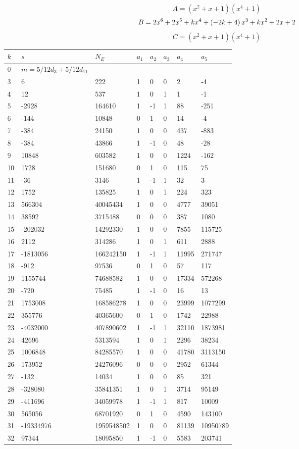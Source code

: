 \documentclass{amsart}
\begin{document}
$$A=(x^2
 + x
 + 1)(x^4
 + 1)$$
$$B=2\*x^6
 + 2\*x^5
 + k\*x^4
 + \left(-2\*k
 + 4\right) \*x^3
 + k\*x^2
 + 2\*x
 + 2$$
$$C=(x^2
 + x
 + 1)(x^4
 + 1)$$
\begin{longtable}{|l|l|l|lllll|}
\hline
$k$ & $s$ & $N_E$ & $a_1$ & $a_2$ & $a_3$ & $a_4$ & $a_5$\\
\hline
0&$m=5/12d_{3}+5/12d_{11}$&&\multicolumn{5}{c|}{}\\
3&6&222&1&0&0&2&-4\\
4&12&537&1&0&1&1&-1\\
5&-2928&164610&1&-1&1&88&-251\\
6&-144&10848&0&1&0&14&-4\\
7&-384&24150&1&0&0&437&-883\\
8&-384&43866&1&-1&0&48&-28\\
9&10848&603582&1&0&0&1224&-162\\
10&1728&151680&0&1&0&115&75\\
11&-36&3146&1&-1&1&32&3\\
12&1752&135825&1&0&1&224&323\\
13&566304&40045434&1&0&0&4777&39051\\
14&38592&3715488&0&0&0&387&1080\\
15&-202032&14292330&1&0&0&7855&115725\\
16&2112&314286&1&0&1&611&2888\\
17&-1813056&166242150&1&-1&1&11995&271747\\
18&-912&97536&0&1&0&57&117\\
19&1155744&74688582&1&0&0&17334&572268\\
20&-720&75485&1&-1&0&16&13\\
21&1753008&168586278&1&0&0&23999&1077299\\
22&355776&40365600&0&1&0&1742&22988\\
23&-4032000&407890602&1&-1&1&32110&1873981\\
24&42696&5313594&1&0&1&2296&38234\\
25&1006848&84285570&1&0&0&41780&3113150\\
26&173952&24276096&0&0&0&2952&61344\\
27&-132&14034&1&0&0&85&321\\
28&-328080&35841351&1&0&1&3714&95149\\
29&-411696&34059978&1&-1&1&817&10009\\
30&565056&68701920&0&1&0&4590&143100\\
31&-19334976&1959548502&1&0&0&81139&10950789\\
32&97344&18095850&1&-1&0&5583&203741\\

\end{longtable}
\end{document}
